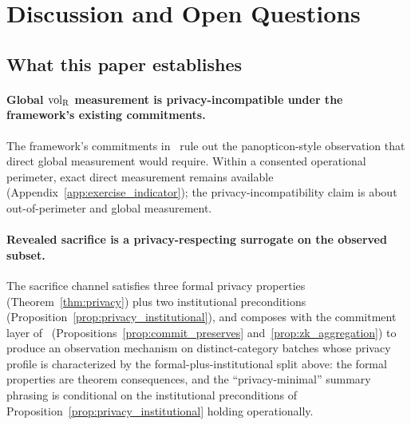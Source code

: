 \section{Discussion and Open Questions}
\label{sec:discussion}

\subsection{What this paper establishes}

\paragraph{Global ${\operatorname{vol}_{\mathrm{R}}}$ measurement is privacy-incompatible
under the framework's existing commitments.}
The framework's commitments
in~\citep{lasser2026exo,lasser2026phase,lasser2026wamura} rule
out the panopticon-style observation that direct global
measurement would require.  Within a consented operational
perimeter, exact direct measurement remains available
(Appendix~\ref{app:exercise_indicator}); the
privacy-incompatibility claim is about out-of-perimeter and
global measurement.

\paragraph{Revealed sacrifice is a privacy-respecting surrogate
on the observed subset.}
The sacrifice channel satisfies three formal privacy properties
(Theorem~\ref{thm:privacy}) plus two institutional preconditions
(Proposition~\ref{prop:privacy_institutional}), and composes
with the commitment layer of~\citep[Exogenous~Verification]{lasser2026exo}
(Propositions~\ref{prop:commit_preserves}
and~\ref{prop:zk_aggregation}) to produce an observation
mechanism on distinct-category batches whose privacy profile is
characterized by the formal-plus-institutional split above:
the formal properties are theorem consequences, and the
``privacy-minimal'' summary phrasing is conditional on the
institutional preconditions of
Proposition~\ref{prop:privacy_institutional} holding
operationally.

